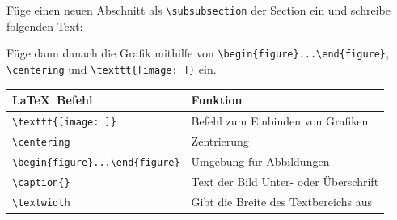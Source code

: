 \begin{frame}[fragile]
	\begin{Aufgabe}
		Füge einen neuen Abschnitt \textrm{} als \lstinline[basicstyle=\normalfont\ttfamily\normalsize]|\subsubsection| der Section \textrm{} ein und schreibe folgenden Text:
		
		\textrm{}
		
		Füge dann danach die Grafik  mithilfe von \lstinline[basicstyle=\normalfont\ttfamily\normalsize]|\begin{figure}...\end{figure}|, \lstinline[basicstyle=\normalfont\ttfamily\normalsize]|\centering| und \lstinline[basicstyle=\normalfont\ttfamily\normalsize]|\texttt{[image: ]}| ein.
	\end{Aufgabe}

	\btVFill\Befehle
	\begin{center}
		\begin{tabular}{ll}
			\toprule
			\LaTeX\ Befehl								&	Funktion								\\ \midrule
			\lstinline|\texttt{[image: ]}|			&	Befehl zum Einbinden von Grafiken		\\ 
			\lstinline|\centering|						&	Zentrierung								\\
			\lstinline|\begin{figure}...\end{figure}|	&	Umgebung für Abbildungen				\\
			\lstinline|\caption{}|						&	Text der Bild Unter- oder Überschrift	\\
			\lstinline|\textwidth|						&	Gibt die Breite des Textbereichs aus	\\
			\bottomrule
		\end{tabular}
	\end{center}
\end{frame}
